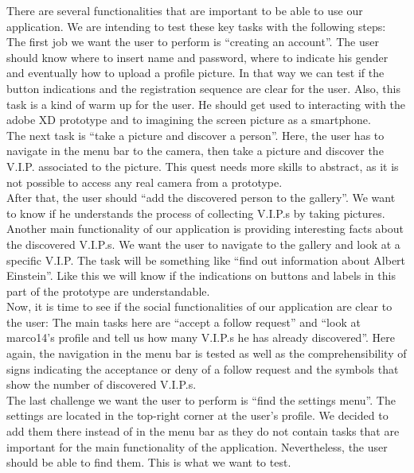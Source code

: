 \documentclass[12pt]{scrartcl}
\begin{document}
		There are several functionalities that are important to be able to use our application. We are intending to test these key tasks with the following steps:\\

		The first job we want the user to perform is “creating an account”. The user should know where to insert name and password, where to indicate his 			gender and eventually how to upload a profile picture. In that way we can test if the button indications and the registration sequence are clear for the 		user. Also, this task is a kind of warm up for the user. He should get used to interacting with the adobe XD prototype and to imagining the screen picture 		as a smartphone.\\

		The next task is “take a picture and discover a person”. Here, the user has to navigate in the menu bar to the camera, then take a picture and discover 		the V.I.P. associated to the picture. This quest needs more skills to abstract, as it is not possible to access any real camera from a prototype.\\

		After that, the user should “add the discovered person to the gallery”. We want to know if he understands the process of collecting V.I.P.s by taking 			pictures.\\

 		Another main functionality of our application is providing interesting facts about the discovered V.I.P.s. We want the user to navigate to the gallery and 		look at a specific V.I.P. The task will be something like “find out information about Albert Einstein”. Like this we will know if the indications on buttons and 		labels in this part of the prototype are understandable.\\

		Now, it is time to see if the social functionalities of our application are clear to the user: The main tasks here are “accept a follow request” and “look at 		marco14’s profile and tell us how many V.I.P.s he has already discovered”. Here again, the navigation in the menu bar is tested as well as the 				comprehensibility of signs indicating the acceptance or deny of a follow request and the symbols that show the number of discovered V.I.P.s.\\

		The last challenge we want the user to perform is “find the settings menu”. The settings are located in the top-right corner at the user’s profile. We 			decided to add them there instead of in the menu bar as they do not contain tasks that are important for the main functionality of the application. 			Nevertheless, the user should be able to find them. This is what we want to test.\\
\end{document}

